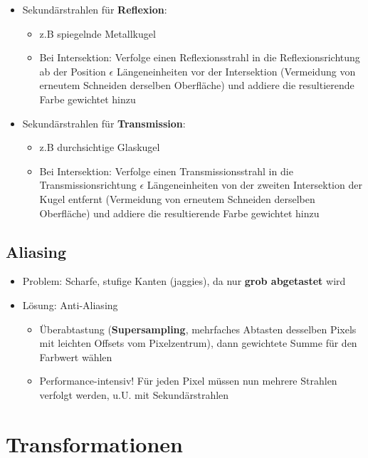\documentclass[10pt,a4paper]{article}
\begin{document}
	\begin{itemize}
		\item Sekundärstrahlen für \textbf{Reflexion}:
			\begin{itemize}
				\item z.B spiegelnde Metallkugel
				\item Bei Intersektion: Verfolge einen Reflexionsstrahl in die Reflexionsrichtung ab der Position $\epsilon$ Längeneinheiten vor der Intersektion (Vermeidung von erneutem Schneiden derselben Oberfläche) und addiere die resultierende Farbe gewichtet hinzu
			\end{itemize}
		\item Sekundärstrahlen für \textbf{Transmission}:
			\begin{itemize}
				\item z.B durchsichtige Glaskugel
				\item Bei Intersektion: Verfolge einen Transmissionsstrahl in die Transmissionsrichtung $\epsilon$ Längeneinheiten von der zweiten Intersektion der Kugel entfernt (Vermeidung von erneutem Schneiden derselben Oberfläche) und addiere die resultierende Farbe gewichtet hinzu
			\end{itemize}
	\end{itemize}

	\subsection{Aliasing}
	\label{sub:aliasing}
	
	\begin{itemize}
		\item Problem: Scharfe, stufige Kanten (\glqq jaggies\grqq), da nur \textbf{grob abgetastet} wird
		\item Lösung: Anti-Aliasing
		\begin{itemize}
			\item Überabtastung (\textbf{Supersampling}, mehrfaches Abtasten desselben Pixels mit leichten Offsets vom Pixelzentrum), dann gewichtete Summe für den Farbwert wählen
			\item Performance-intensiv! Für jeden Pixel müssen nun mehrere Strahlen verfolgt werden, u.U. mit Sekundärstrahlen
		\end{itemize}
	\end{itemize}

	\newpage
	\section{Transformationen}
	\label{sec:transformationen}
	
\end{document}
